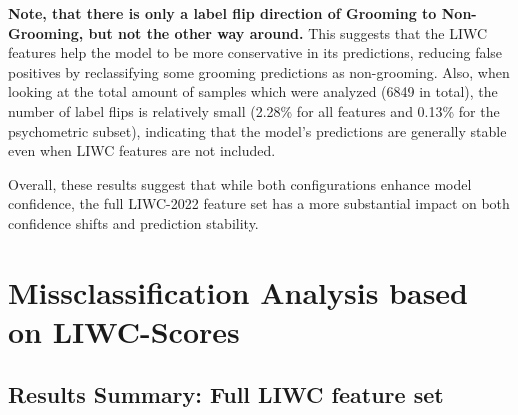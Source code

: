 \textbf{Note, that there is only a label flip direction of Grooming to Non-Grooming, but not the other way around.} This suggests that the LIWC features help the model to be more conservative in its predictions, reducing false positives by reclassifying some grooming predictions as non-grooming. Also, when looking at the total amount of samples which were analyzed (6849 in total), the number of label flips is relatively small (2.28\% for all features and 0.13\% for the psychometric subset), indicating that the model's predictions are generally stable even when LIWC features are not included.

Overall, these results suggest that while both configurations enhance model confidence, the full LIWC-2022 feature set has a more substantial impact on both confidence shifts and prediction stability.


\section{Missclassification Analysis based on LIWC-Scores} \label{sec:misclassification_analysis}


\subsection{Results Summary: Full LIWC feature set}

